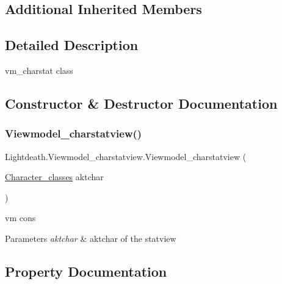 \subsection*{Additional Inherited Members}


\subsection{Detailed Description}
vm\+\_\+charstat class 



\subsection{Constructor \& Destructor Documentation}
\hypertarget{class_lightdeath_1_1_viewmodel__charstatview_a784847691e63627f73f804f03f3ef677}{}\label{class_lightdeath_1_1_viewmodel__charstatview_a784847691e63627f73f804f03f3ef677} 
\subsubsection{\texorpdfstring{Viewmodel\+\_\+charstatview()}{Viewmodel\_charstatview()}}
{\footnotesize\ttfamily Lightdeath.\+Viewmodel\+\_\+charstatview.\+Viewmodel\+\_\+charstatview (\begin{DoxyParamCaption}\item[{\hyperlink{class_lightdeath_1_1_character__classes}{Character\+\_\+classes}}]{aktchar }\end{DoxyParamCaption})\hspace{0.3cm}{\ttfamily [inline]}}



vm cons 


\begin{DoxyParams}{Parameters}
{\em aktchar} & aktchar of the statview\\
\hline
\end{DoxyParams}


\subsection{Property Documentation}
\hypertarget{class_lightdeath_1_1_viewmodel__charstatview_a90dea691e5d3a1ae007bec7f4fa581fe}{}\label{class_lightdeath_1_1_viewmodel__charstatview_a90dea691e5d3a1ae007bec7f4fa581fe} 
